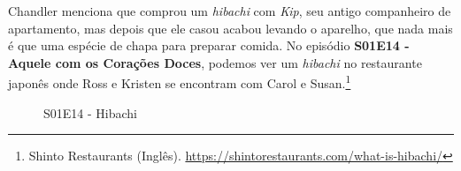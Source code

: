 Chandler menciona que comprou um \emph{hibachi} com \emph{Kip}, seu
antigo companheiro de apartamento, mas depois que ele casou acabou
levando o aparelho, que nada mais é que uma espécie de chapa para
preparar comida. No episódio
\textbf{\textcolor{primarycolor}{S01E14 - Aquele com os Corações Doces}},
podemos ver um \emph{hibachi} no restaurante japonês onde Ross e Kristen
se encontram com Carol e Susan.\footnote{\sloppy Shinto Restaurants (Inglês). \url{https://shintorestaurants.com/what-is-hibachi/}}

\begin{figure}
  \centering
    \caption{S01E14 - Hibachi\label{fig:s01-e14-hibachi}}
\end{figure}
